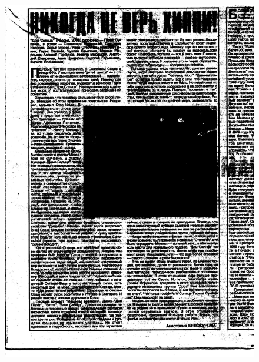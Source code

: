 \documentclass{book}
\begin{document}
\begin{figure}[H]
\begin{center}
\includegraphics[scale=0.2]{images/1g_binary.jpg}

\end{center}
\end{figure}
\end{document}

